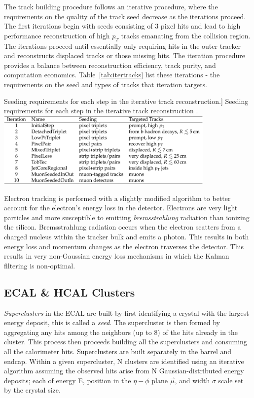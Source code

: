 The track building procedure follows an iterative procedure, where the requirements on the quality of the track seed decrease as the iterations proceed. The first iterations begin with seeds consisting of 3 pixel hits and lead to high performance reconstruction of high $p_{T}$ tracks emanating from the collision region. The iterations proceed until essentially only requiring hits in the outer tracker and reconstructs displaced tracks or those missing hits. The iteration procedure provides a balance between reconstruction efficiency, track purity, and computation economics. Table~\ref{tab:itertracks} list these iterations - the requirements on the seed and types of tracks that iteration targets.

\begin{table}[hbp!]
\caption
[Seeding requirements for each step in the iterative track reconstruction.]
{Seeding requirements for each step in the iterative track reconstruction \cite{CMS-PRF-14-001}.}
\centering
\includegraphics[width=0.8\textwidth]{figs/itertracks.png}
\label{tab:itertracks}
\end{table}

Electron tracking is performed with a slightly modified algorithm to better account for the electron's energy loss in the detector. Electrons are very light particles and more susceptible to emitting \textit{bremsstrahlung} radiation than ionizing the silicon. Bremsstrahlung radiation occurs when the electron scatters from a charged nucleus within the tracker bulk and emits a photon. This results in both energy loss and momentum changes as the electron traverses the detector. This results in very non-Gaussian energy loss mechanisms in which the Kalman filtering is non-optimal.

\subsection{ECAL \& HCAL Clusters}

\textit{Superclusters} in the ECAL are built by first identifying a crystal with the largest energy deposit, this is called a \textit{seed}. The supercluster is then formed by aggregating any hits among the neighbors (up to 8) of the hits already in the cluster. This process then proceeds building all the superclusters and consuming all the calorimeter hits. Superclusters are built separately in the barrel and endcap. Within a given supercluster, N clusters are identified using an iterative algorithm assuming the observed hits arise from N Gaussian-distributed energy deposits; each of energy E, position in the $\eta-\phi$ plane $\vec{\mu}$, and width $\sigma$ scale set by the crystal size.

